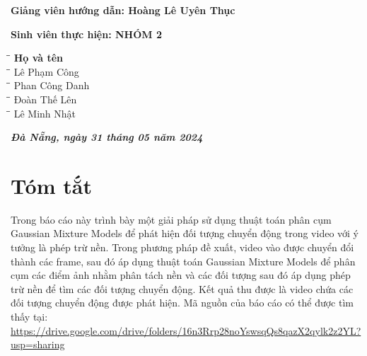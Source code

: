 \documentclass[a4paper]{article}
\begin{document}
\begin{titlepage}
\vspace{50pt}
\begin{addmargin}[1cm]{0cm}
\textbf{Giảng viên hướng dẫn: \hspace{2cm}Hoàng Lê Uyên Thục}
\end{addmargin}
\vspace{10pt}
\begin{addmargin}[1cm]{0cm}
\textbf{Sinh viên thực hiện: \hspace{2.6cm}NHÓM 2}
\begin{tabbing}
\hspace{6cm}\=\hspace{3cm}\=\hspace{3cm} \kill
{\textbf{Họ và tên}}\\
\hspace{6cm}\=\hspace{3cm}\=\hspace{3cm} \kill
Lê Phạm Công\\
\hspace{6cm}\=\hspace{3cm}\=\hspace{3cm} \kill
Phan Công Danh\\
\hspace{6cm}\=\hspace{3cm}\=\hspace{3cm} \kill
Đoàn Thế Lên\\
\hspace{6cm}\=\hspace{3cm}\=\hspace{3cm} \kill
Lê Minh Nhật\\
\end{tabbing}
\end{addmargin}
\vspace{1cm}
\begin{center}
    \textit{\textbf{Đà Nẵng, ngày 31 tháng 05 năm 2024}}
\end{center}
\end{titlepage}
\newpage
\tableofcontents
\newpage

\section*{Tóm tắt}
Trong báo cáo này trình bày một giải pháp sử dụng thuật toán
phân cụm Gaussian Mixture Models để phát hiện đối tượng chuyển động trong video với ý tưởng là phép trừ nền. Trong phương pháp đề xuất, video vào được chuyển đổi thành các frame,
sau đó áp dụng thuật toán Gaussian Mixture Models để phân cụm các điểm ảnh nhằm phân tách nền và các đối tượng sau đó áp dụng phép trừ nền để tìm các đối tượng chuyển động. Kết quả thu được là video chứa các đối tượng chuyển động được phát hiện. 
Mã nguồn của báo cáo có thể được tìm thấy tại: \url{https://drive.google.com/drive/folders/16n3Rrp28noYswsqQs8qazX2qylk2z2YL?usp=sharing}
\end{document}
